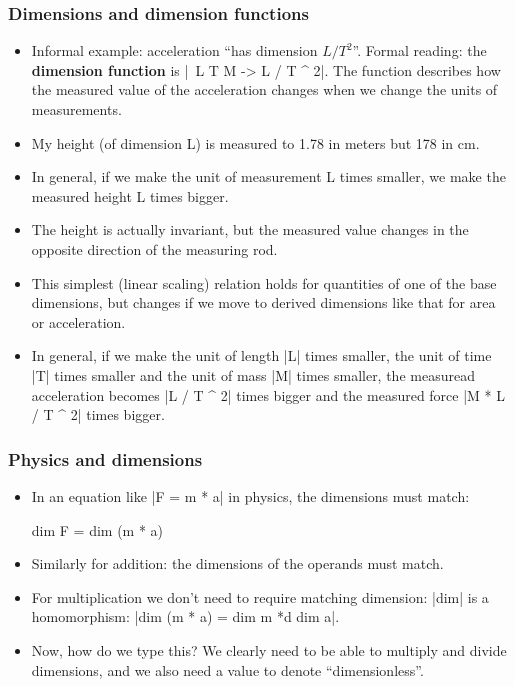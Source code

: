 \documentclass[aspectratio=169]{beamer}
\begin{document}
\begin{frame}
\frametitle{Dimensions and dimension functions}
\begin{itemize}
\item Informal example: acceleration ``has dimension \(L /
  T^2\)''. Formal reading: the \textbf{dimension function}
  is |\ L T M -> L / T ^ 2|. The function describes how the measured
  value of the acceleration changes when we change the units of
  measurements.
\pause
\item My height (of dimension L) is measured to 1.78 in meters but 178 in
  cm.
\item In general, if we make the unit of measurement L times smaller,
  we make the measured height L times bigger.
\item The height is actually invariant, but the measured value changes
  in the opposite direction of the measuring rod.
\pause
\item This simplest (linear scaling) relation holds for quantities of
  one of the base dimensions, but changes if we move to derived
  dimensions like that for area or acceleration.
\item In general, if we make the unit of length |L| times smaller, the
  unit of time |T| times smaller and the unit of mass |M| times
  smaller, the measuread acceleration becomes |L / T ^ 2| times bigger
  and the measured force |M * L / T ^ 2| times bigger.
\end{itemize}
\end{frame}
\begin{frame}
  \frametitle{Physics and dimensions}
\begin{itemize}
\item In an equation like |F = m * a| %
  in physics, the dimensions must match:
\begin{spec}
dim F = dim (m * a)
\end{spec}
\item Similarly for addition: the dimensions of the operands must match.
\pause
\item For multiplication we don't need to require matching dimension:
  |dim| is a homomorphism: |dim (m * a) = dim m *d dim a|.
\item Now, how do we type this? We clearly need to be able to multiply
  and divide dimensions, and we also need a value to denote
  ``dimensionless''.
\end{itemize}
\end{frame}
\end{document}
